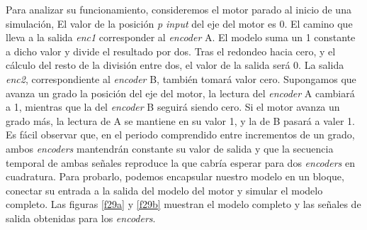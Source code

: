 \documentclass[10pt,a4paper]{report}
\begin{document}
Para analizar su funcionamiento, consideremos el motor parado al inicio de una simulación, El valor de la posición \emph{p input} del eje del motor es $0$. El camino que lleva a la salida \emph{enc1} corresponder al \emph{encoder} A. El modelo suma un 1 constante a dicho valor y divide el resultado por dos. Tras el redondeo hacia cero, y el cálculo del resto de la división entre  dos, el valor de la salida será 0. La salida \emph{enc2}, correspondiente al \emph{encoder} B, también tomará valor cero. Supongamos que avanza un grado la posición del eje del motor, la lectura del \emph{encoder} A cambiará a 1, mientras que la del \emph{encoder} B seguirá siendo cero. Si el motor avanza un grado más, la lectura de A se mantiene en su valor 1, y la de B pasará a valer 1. Es fácil observar que, en el periodo comprendido entre incrementos de un grado, ambos \emph{encoders} mantendrán constante su valor de salida y que la secuencia temporal de ambas señales reproduce la que cabría esperar para dos \emph{encoders} en cuadratura. Para probarlo, podemos encapsular nuestro modelo en un bloque, conectar su entrada a la salida del modelo del motor y simular el modelo completo. Las figuras \ref{f29a} y \ref{f29b} muestran el modelo completo y las señales de salida obtenidas para los \emph{encoders}.
\end{document}
